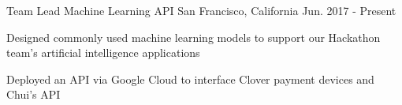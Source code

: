 \begin{cventries}
\cventry
{Team Lead} %
{Machine Learning API} %
{San Francisco, California} %
{Jun. 2017 - Present} %
{ %
\begin{cvitems}
\item {Designed commonly used machine learning models to support our Hackathon team's artificial intelligence applications}
\item {Deployed an API via Google Cloud to interface Clover payment devices and Chui's API}
\end{cvitems}
}

\begin{comment}
\cventry
{Solo} %
{Text File Compression} %
{San Luis Obispo, California} %
{Oct. 2016 - Nov. 2016} %
{ %
\begin{cvitems}
\item {Implemented Huffman Coding to compress text files in Java and C}
\item {Designed complimentary encoding program to compress files into characters to serve an educational purpose for those learning how compression works}
\end{cvitems}
}
\end{comment}

\begin{comment}
\cventry
{Software Lead} %
{Flash Card iOS Study Tool} %
{San Luis Obispo, California} %
{Oct. 2015 - Dec. 2015} %
{ %
\begin{cvitems}
\item {Developed an iOS application to help groups of students study together with a flashcard like application} \item {Utilized device's accelerometer to navigate through application's storyboard}
\item {Used Swift and MongoDB to allow local and remote storage for the data necessary for the application}
\end{cvitems}
}
\end{comment}
\end{cventries}

